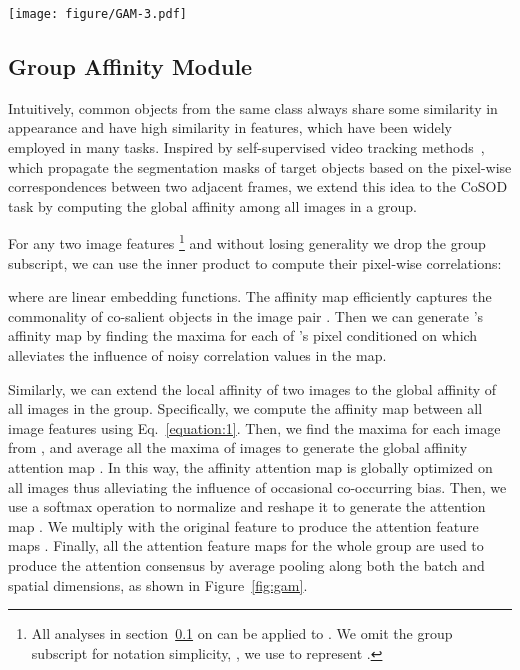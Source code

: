 \documentclass[final]{cvpr}
\begin{document}
\begin{figure*}[!t]
\centering
\texttt{[image: figure/GAM-3.pdf]}
\caption{\textbf{Group Affinity Module.} We first exploit the affinity attention to generate the attention maps for the input features by collaborating all images in group. Subsequently, the maps are multiplied with the input features to generate the consensus for the group. Then the obtained consensus is used to coordinate the original feature maps and is also fed to the GCM for inter-group collaborative learning.}
\label{fig:gam}
\end{figure*}

\subsection{Group Affinity Module}
\label{section:3.2}

Intuitively, common objects from the same class always share some similarity in appearance and have high similarity in features, which have been widely employed in many tasks. Inspired by self-supervised video tracking methods~\cite{vondrick2018tracking,lai2019self,wang2019learning,lai2020mast}, which propagate the segmentation masks of target objects based on the pixel-wise correspondences between two adjacent frames, we extend this idea to the CoSOD task by computing the global affinity among all images in a group. 

For any two image features  \footnote{All  analyses in section~\ref{section:3.2}  on  can be applied to 
. We omit the group subscript for notation simplicity, \ie, we use  to represent .} and without losing generality we drop the group subscript, we can use the inner product to compute their pixel-wise correlations:

where  are linear embedding functions. The affinity map  efficiently captures the commonality of co-salient objects in the image pair . Then we can generate 's affinity map  by finding the maxima for each of 's pixel conditioned on  which alleviates the influence of noisy correlation values in the map.


Similarly, we can extend the local affinity of two images to the global affinity of all images in the group. 
Specifically, we compute the affinity map  between all image features  using Eq.~\ref{equation:1}. Then, we find the maxima for each image  from , and average all the maxima of  images to generate the global affinity attention map . 
In this way, the affinity attention map is globally optimized on all images thus alleviating the influence of occasional co-occurring bias. Then, we use a softmax operation to normalize  and reshape it to generate the attention map . We multiply  with the original feature  to produce the attention feature maps .
Finally, all the attention feature maps  for the whole group are used to produce the attention consensus  by average pooling along both the batch and spatial dimensions, as shown in Figure~\ref{fig:gam}. 
\end{document}

